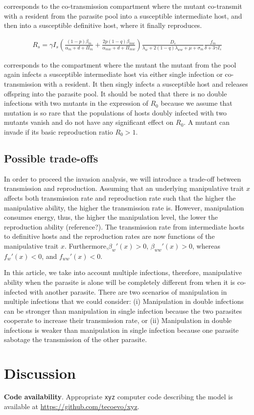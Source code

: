 \documentclass{article}
\begin{document}
corresponds to the co-transmission compartment where the mutant co-transmit with a resident from the parasite pool into a susceptible intermediate host, and then into a susceptible definitive host, where it finally reproduces.

\begin{align*}
R_s = \gamma  I_s \left(\frac{(1-p) \beta_m}{\alpha_m + d + \Pi_m} + \frac{2 p (1-q) \beta_{mw}}{\alpha_{mw} + d + \Pi_{mw}}\right) \frac{D_s}{\lambda_w  + 2 (1-q) \lambda_{ww} + \mu + \sigma_m}\frac{f_m}{\delta +3 \gamma  I_s}
\end{align*}

corresponds to the compartment where the mutant the mutant from the pool again infects a susceptible intermediate host via either single infection or co-transmission with a resident. It then singly infects a susceptible host and releases offspring into the parasite pool. It should be noted that there is no double infections with two mutants in the expression of $R_0$ because we assume that mutation is so rare that the populations of hosts doubly infected with two mutants vanish and do not have any significant effect on $R_0$. A mutant can invade if its basic reproduction ratio $R_0 > 1$. 

\subsection{Possible trade-offs}
In order to proceed the invasion analysis, we will introduce a trade-off between transmission and reproduction. Assuming that an underlying manipulative trait $x$ affects both transmission rate and reproduction rate such that the higher the manipulative ability, the higher the transmission rate is. However, manipulation consumes energy, thus, the higher the manipulation level, the lower the reproduction ability (reference?). The transmission rate from intermediate hosts to definitive hosts and the reproduction rates are now functions of the manipulative trait $x$. Furthermore,$\beta_w'(x) > 0$, $\beta_{ww}'(x) > 0$, whereas $f_w'(x) < 0$, and $f_{ww}'(x) < 0$.

In this article, we take into account multiple infections, therefore, manipulative ability when the parasite is alone will be completely different from when it is co-infected with another parasite. There are two scenarios of manipulation in multiple infections that we could consider: (i) Manipulation in double infections can be stronger than manipulation in single infection because the two parasites cooperate to increase their transmission rate, or (ii) Manipulation in double infections is weaker than manipulation in single infection because one parasite sabotage the transmission of the other parasite. 
\section{Discussion}

\textbf{Code availability}.
Appropriate {\tt{xyz}} computer code describing the model is available at {\url{https://github.com/tecoevo/xyz}}.







\appendix
\end{document}
